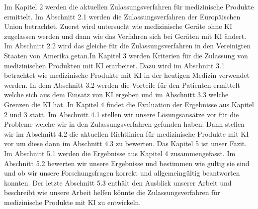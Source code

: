 Im Kapitel 2 werden die aktuellen Zulassungsverfahren für medizinische Produkte ermittelt. Im Abschnitt 2.1 werden die Zulassungsverfahren der Europäischen Union betrachtet. Zuerst wird untersucht wie medizinische Geräte ohne KI zugelassen werden und dann wie das Verfahren sich bei Geräten mit KI ändert. Im Abschnitt 2.2 wird das gleiche für die Zulassungsverfahren in den Vereinigten Staaten von Amerika getan.\linebreak In Kapitel 3 werden Kriterien für die Zulassung von medizinischen Produkten mit KI erarbeitet. Dazu wird im Abschnitt 3.1  betrachtet wie medizinische Produkte mit KI in der heutigen Medizin verwendet werden. In dem Abschnitt 3.2 werden die Vorteile für den Patienten ermittelt welche sich aus dem Einsatz von KI ergeben und im Abschnitt 3.3 welche Grenzen die KI hat. In Kapitel 4 findet die Evaluation der Ergebnisse aus Kapitel 2 und 3 statt. Im Abschnitt 4.1 stellen wir unsere Lösungsansätze vor für die Probleme welche wir in den Zulassungsverfahren gefunden haben. Dann stellen wir im Abschnitt 4.2 die aktuellen Richtlinien für medizinische Produkte mit KI vor um diese dann im Abschnitt 4.3 zu bewerten. Das Kapitel 5 ist unser Fazit. Im Abschnitt 5.1 werden die Ergebnisse aus Kapitel 4 zusammengefasst. Im Abschnitt 5.2 bewerten wir unsere Ergebnisse und bestimmen wie gültig sie sind und ob wir unsere Forschungsfragen korrekt und allgemeingültig beantworten konnten. Der letzte Abschnitt 5.3 enthält den Ausblick unserer Arbeit und beschreibt wie unsere Arbeit helfen könnte die Zulassungsverfahren für medizinische Produkte mit KI zu entwickeln.